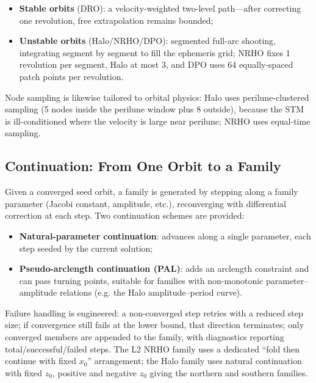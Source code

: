 \begin{itemize}
  \item \textbf{Stable orbits} (DRO): a velocity-weighted two-level
        path---after correcting one revolution, free extrapolation remains
        bounded;
  \item \textbf{Unstable orbits} (Halo/NRHO/DPO): segmented full-arc
        shooting, integrating segment by segment to fill the ephemeris grid;
        NRHO fixes 1 revolution per segment, Halo at most 3, and DPO uses 64
        equally-spaced patch points per revolution.
\end{itemize}

Node sampling is likewise tailored to orbital physics: Halo uses
perilune-clustered sampling (5 nodes inside the perilune window plus 8
outside), because the STM is ill-conditioned where the velocity is large
near perilune; NRHO uses equal-time sampling.

\subsection{Continuation: From One Orbit to a Family}

Given a converged seed orbit, a family is generated by stepping along a
family parameter (Jacobi constant, amplitude, etc.), reconverging with
differential correction at each step. Two continuation schemes are provided:

\begin{itemize}
  \item \textbf{Natural-parameter continuation}: advances along a single
        parameter, each step seeded by the current solution;
  \item \textbf{Pseudo-arclength continuation (PAL)}: adds an arclength
        constraint and can pass turning points, suitable for families with
        non-monotonic parameter--amplitude relations (e.g. the Halo
        amplitude--period curve).
\end{itemize}

Failure handling is engineered: a non-converged step retries with a reduced
step size; if convergence still fails at the lower bound, that direction
terminates; only converged members are appended to the family, with
diagnostics reporting total/successful/failed steps. The L2 NRHO family uses
a dedicated ``fold then continue with fixed $x_0$'' arrangement; the Halo
family uses natural continuation with fixed $z_0$, positive and negative
$z_0$ giving the northern and southern families.

